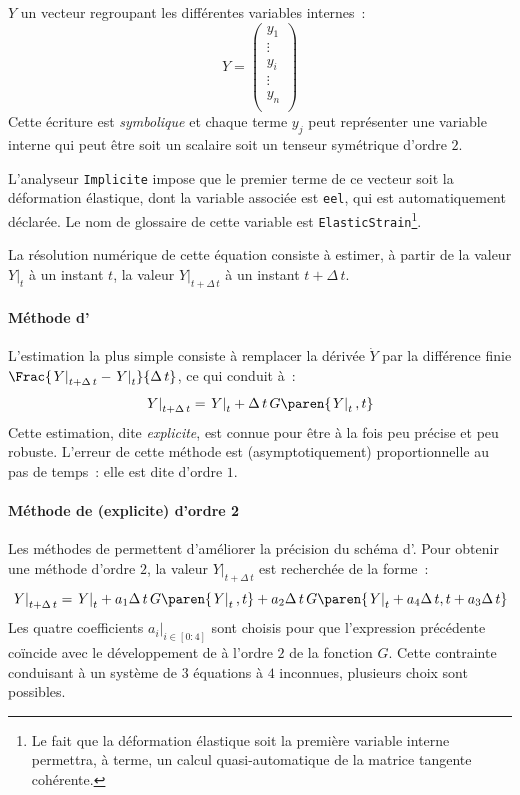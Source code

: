\documentclass[rectoverso,pleiades,pstricks,leqno,anti]{texmf/note_technique_2010}
\newcommand{\debutpas}[1]{\ensuremath{\left.#1\right|_{t}}}
\newcommand{\finpas}[1]{\ensuremath{\left.#1\right|_{t+\Delta\, t}}}
\begin{document}
\(Y\) un vecteur regroupant les différentes variables internes~:
\[
Y=
\begin{pmatrix}
  y_{1} \\
  \vdots \\
  y_{i} \\
  \vdots \\
  y_{n} \\
\end{pmatrix}
\]
Cette écriture est {\em symbolique} et chaque terme \(y_{j}\) peut
représenter une variable interne qui peut être soit un scalaire soit un
tenseur symétrique d'ordre \(2\).

L'analyseur \texttt{Implicite} impose que le premier terme de ce vecteur
soit la déformation élastique, dont la variable associée est
\texttt{eel}, qui est automatiquement déclarée. Le nom de glossaire de
cette variable est \texttt{Elastic\-Strain}\footnote{Le fait que la
  déformation élastique soit la première variable interne permettra, à
  terme, un calcul quasi-automatique de la matrice tangente cohérente.}.

La résolution numérique de cette équation consiste à estimer, à partir
de la valeur \(\debutpas{Y}\) à un instant \(t\), la valeur
\(\finpas{Y}\) à un instant \(t+\Delta\, t\).

\paragraph{Méthode d'}
L'estimation la plus simple consiste à remplacer la dérivée
\(\dot{Y}\) par la différence finie
\(\Frac{\finpas{Y}-\debutpas{Y}}{\Delta\, t}\), ce qui conduit à~:
\begin{equation}
  \label{eq:explicite-implicite}
  \finpas{Y}=\debutpas{Y}+\Delta\,t\,G\paren{\debutpas{Y},t}
\end{equation}
Cette estimation, dite {\em explicite}, est connue pour être à la fois
peu précise et peu robuste. L'erreur de cette méthode est
(asymptotiquement) proportionnelle au pas de temps~: elle est dite
d'ordre \(1\).

\paragraph{Méthode de  (explicite) d'ordre 2}
Les méthodes de  permettent d'améliorer la précision
du schéma d'. Pour obtenir une méthode d'ordre \(2\), la
valeur \(\finpas{Y}\) est recherchée de la forme~:
\[
\finpas{Y} = \debutpas{Y}+a_{1}\Delta\,t\,G\paren{\debutpas{Y},t}+a_{2}\Delta\,t\,G\paren{\debutpas{Y}+a_{4}\Delta\, t,t+a_{3}\Delta\,t}
\]
Les quatre coefficients \(\left.a_{i}\right|_{i \in [0:4]}\) sont
choisis pour que l'expression précédente coïncide avec le
développement de  à l'ordre \(2\) de la fonction \(G\).
Cette contrainte conduisant à un système de \(3\) équations à \(4\)
inconnues, plusieurs choix sont possibles.
\end{document}
